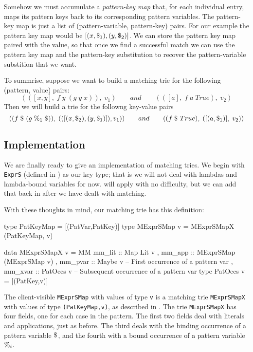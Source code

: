 \documentclass[acmsmall]{acmart}
\theoremstyle{theorem}
\theoremstyle{definition}
\theoremstyle{remark}
\begin{document}
Somehow we must accumulate a \emph{pattern-key map} that, for each
individual entry, maps its pattern keys back to its corresponding
pattern variables.  The pattern-key map is just a list of (pattern-variable, pattern-key) pairs.
For our example the pattern key map would be
$[(x, \$_{1}), (y,\$_{2})]$.  We can store the pattern key
map paired with the value, so that once we find a successful match we can use the pattern
key map and the pattern-key substitution to recover the pattern-variable substition that we want.

To summrise, suppose we want to build a matching trie for the following (pattern, value) pairs:
$$
(([x,y],\; f\;y\;(g\;y\;x)),\; v_1) \qquad and \qquad (([a],\; f\;a\;True),\;v_2)
$$
Then we will build a trie for the followng key-value pairs
$$
( (f \;\$_{}\;(g\;\%_{1}\;\$_{})),\; (([(x,\$_{2}),(y,\$_{1})]), v_1) )
  \qquad and \qquad
( (f \;\$_{}\;True),\; ([(a,\$_{1})],\;v_2) )
$$


\subsection{Implementation}

We are finally ready to give an implementation of matching tries.
We begin with \lstinline{ExprS} (defined in ) as our key type;
that is we will not deal with lambdas and lambda-bound variables for now.
 will apply with no difficulty, but we can add that back
in after we have dealt with matching.

With these thoughts in mind, our matching trie has this definition:
\begin{code}
type PatKeyMap   = [(PatVar,PatKey)]
type MExprSMap v = MExprSMapX (PatKeyMap, v)

data MExprSMapX v
    = MM { mm_lit  :: Map Lit v
         , mm_app  :: MExprSMap (MExprSMap v)
         , mm_pvar :: Maybe v     -- First occurrence of a pattern var
         , mm_xvar :: PatOccs v   -- Subsequent occurrence of a pattern var
       }
type PatOccs v = [(PatKey,v)]
\end{code}
The client-visible \lstinline{MExprSMap} with values of type \lstinline{v}
is a matching trie \lstinline{MExprSMapX} with values of type \lstinline{(PatKeyMap,v)},
as described in .
The trie \lstinline{MExprSMapX} has four fields, one for each case in the pattern.
The first two fields deal with literals and applications, just as before. The third deals with the binding occurrence
of a pattern variable $\$_{}$, and the fourth with a bound occurrence of
a pattern variable $\%_{i}$.
\end{document}
